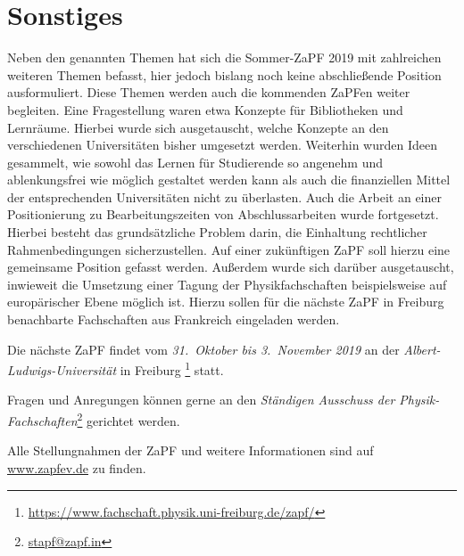 \section*{Sonstiges}
Neben den genannten Themen hat sich die Sommer-ZaPF 2019 mit zahlreichen weiteren Themen befasst, hier jedoch bislang noch keine abschließende Position ausformuliert. Diese Themen werden auch die kommenden ZaPFen weiter begleiten. 
Eine Fragestellung waren etwa Konzepte für Bibliotheken und Lernräume.
Hierbei wurde sich ausgetauscht, welche Konzepte an den verschiedenen Universitäten bisher umgesetzt werden. 
Weiterhin wurden Ideen gesammelt, wie sowohl das Lernen für Studierende so angenehm und ablenkungsfrei wie möglich gestaltet werden kann als auch die finanziellen Mittel der entsprechenden Universitäten nicht zu überlasten. 
Auch die Arbeit an einer Positionierung zu Bearbeitungszeiten von Abschlussarbeiten wurde fortgesetzt.
Hierbei besteht das grundsätzliche Problem darin, die Einhaltung rechtlicher Rahmenbedingungen sicherzustellen. Auf einer zukünftigen ZaPF soll hierzu eine gemeinsame Position gefasst werden.
Außerdem wurde sich darüber ausgetauscht, inwieweit die Umsetzung einer Tagung der Physikfachschaften beispielsweise auf europärischer Ebene möglich ist.
Hierzu sollen für die nächste ZaPF in Freiburg benachbarte Fachschaften aus Frankreich eingeladen werden. 

		
\vfill
		
Die nächste ZaPF findet vom \emph{31.\ Oktober bis 3.\ November 2019} an der  \emph{Albert-Ludwigs-Universität} in Freiburg \footnote{\url{https://www.fachschaft.physik.uni-freiburg.de/zapf/}} statt.
		
Fragen und Anregungen können gerne an den \emph{Ständigen Ausschuss der Physik-Fachschaften}\footnote{\href{mailto:stapf@zapf.in}{\url{stapf@zapf.in}}} gerichtet werden.
		
Alle Stellungnahmen der ZaPF und weitere Informationen sind auf \href{http://www.zapfev.de}{\url{www.zapfev.de}} zu finden.
		
		
		
		
